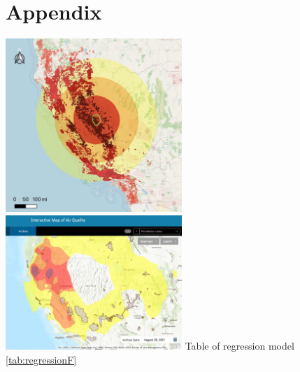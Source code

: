 \documentclass[
  12pt,
]{article}
\begin{document}
\newpage

\hypertarget{appendix}{%
\section{Appendix}\label{appendix}}

\includegraphics[width=0.5\textwidth,height=\textheight]{Output/buffer.JPG}
\includegraphics[width=0.5\textwidth,height=\textheight]{Output/AirQualityMap.JPG}
\newline
Table of regression model
\ref{tab:regressionF}
\end{document}
